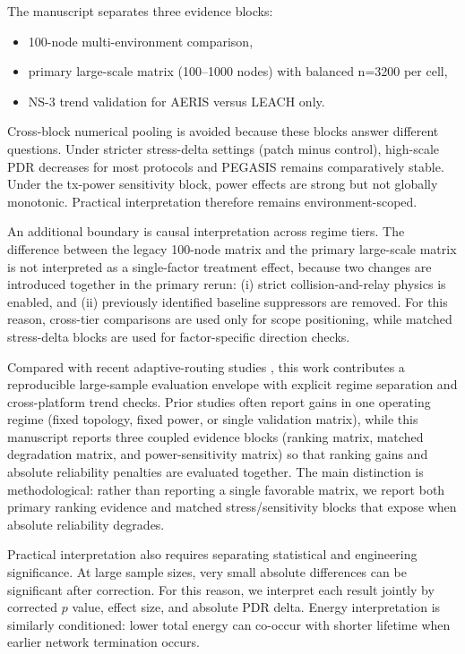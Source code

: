 ﻿\documentclass[sensors,article,submit,moreauthors,pdftex]{Definitions/mdpi}
\begin{document}
The manuscript separates three evidence blocks:
\begin{itemize}
\item 100-node multi-environment comparison,
\item primary large-scale matrix (100--1000 nodes) with balanced n=3200 per cell,
\item NS-3 trend validation for AERIS versus LEACH only.
\end{itemize}
Cross-block numerical pooling is avoided because these blocks answer different questions. Under stricter stress-delta settings (patch minus control), high-scale PDR decreases for most protocols and PEGASIS remains comparatively stable. Under the tx-power sensitivity block, power effects are strong but not globally monotonic. Practical interpretation therefore remains environment-scoped.

An additional boundary is causal interpretation across regime tiers. The difference between the legacy 100-node matrix and the primary large-scale matrix is not interpreted as a single-factor treatment effect, because two changes are introduced together in the primary rerun: (i) strict collision-and-relay physics is enabled, and (ii) previously identified baseline suppressors are removed. For this reason, cross-tier comparisons are used only for scope positioning, while matched stress-delta blocks are used for factor-specific direction checks.

Compared with recent adaptive-routing studies \cite{Ren2024,Okine2024,Naeem2024DRL,Scientific2025DRLGNN,Kaddi2024GWOCSMA,Wang2024Geographic,Tariq2024A,Jain2025Optimized,Ti2026HEOCP,Manogaran2025DDQN}, this work contributes a reproducible large-sample evaluation envelope with explicit regime separation and cross-platform trend checks. Prior studies often report gains in one operating regime (fixed topology, fixed power, or single validation matrix), while this manuscript reports three coupled evidence blocks (ranking matrix, matched degradation matrix, and power-sensitivity matrix) so that ranking gains and absolute reliability penalties are evaluated together. The main distinction is methodological: rather than reporting a single favorable matrix, we report both primary ranking evidence and matched stress/sensitivity blocks that expose when absolute reliability degrades.

Practical interpretation also requires separating statistical and engineering significance. At large sample sizes, very small absolute differences can be significant after correction. For this reason, we interpret each result jointly by corrected $p$ value, effect size, and absolute PDR delta. Energy interpretation is similarly conditioned: lower total energy can co-occur with shorter lifetime when earlier network termination occurs.
\end{document}
